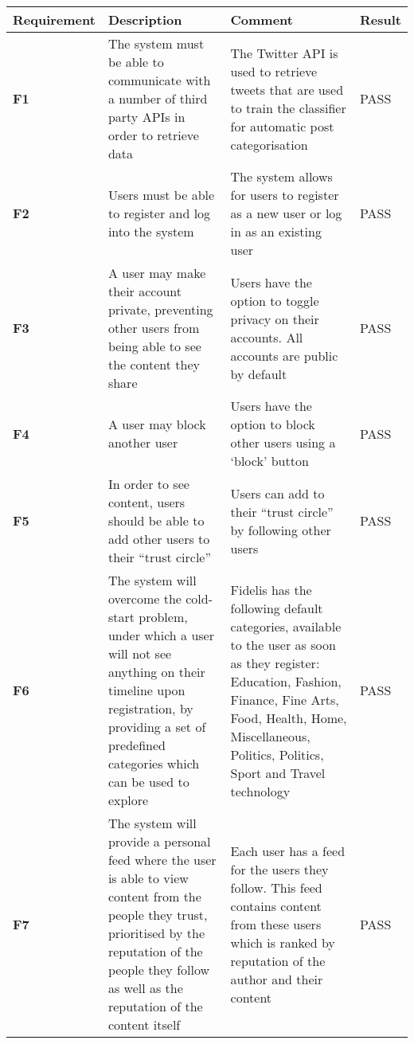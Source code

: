 \begin{longtabu} to \textwidth {XXXX}
\hline
Requirement & Description & Comment & Result \\ 
\hline
\textbf{F1} & The system must be able to communicate with a number of third party APIs in order to retrieve data & The Twitter API is used to retrieve tweets that are used to train the classifier for automatic post categorisation \vspace{2mm} & \textcolor{passgreen}{PASS} \\
\textbf{F2} & Users must be able to register and log into the system & The system allows for users to register as a new user or log in as an existing user \vspace{2mm} & \textcolor{passgreen}{PASS} \\
\textbf{F3} & A user may make their account private, preventing other users from being able to see the content they share & Users have the option to toggle privacy on their accounts. All accounts are public by default \vspace{2mm} & \textcolor{passgreen}{PASS} \\
\textbf{F4} & A user may block another user & Users have the option to block other users using a `block' button \vspace{2mm} & \textcolor{passgreen}{PASS} \\
\textbf{F5} & In order to see content, users should be able to add other users to their ``trust circle'' \vspace{2mm} & Users can add to their ``trust circle'' by following other users & \textcolor{passgreen}{PASS} \\
\textbf{F6} & The system will overcome the cold-start problem, under which a user will not see anything on their timeline upon registration, by providing a set of predefined categories which can be used to explore &                                                                                            Fidelis has the following default categories, available to the user as soon as they register: Education, Fashion, Finance, Fine Arts, Food, Health, Home, Miscellaneous, Politics, Politics, Sport and Travel technology \vspace{2mm} & \textcolor{passgreen}{PASS}  \\
\textbf{F7} & The system will provide a personal feed where the user is able to view content from the people they trust, prioritised by the reputation of the people they follow as well as the reputation of the content itself  \vspace{2mm} & Each user has a feed for the users they follow. This feed contains content from these users which is ranked by reputation of the author and their content & \textcolor{passgreen}{PASS} \\

\end{longtabu}

